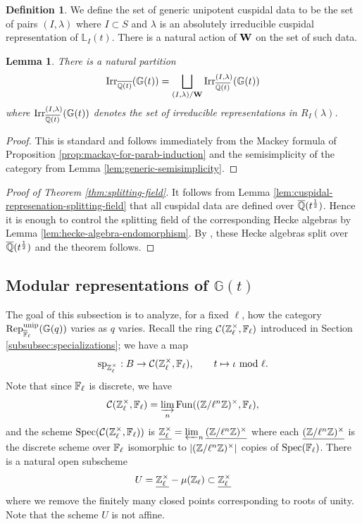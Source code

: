 \documentclass[a4paper, 10pt, oneside, reqno]{amsart}
\theoremstyle{plain}
\newtheorem{lem}[thm]{Lemma}
\theoremstyle{definition}
\newtheorem{defi}[thm]{Definition}
\theoremstyle{remark}
\newcommand{\Gbb}{\mathbb{G}}
\newcommand{\spe}{\mathrm{sp}}
\newcommand{\Lbb}{\mathbb{L}}
\begin{document}
\begin{defi}
We define  the set of generic unipotent cuspidal data to be the set of pairs $(I, \lambda)$ where $I \subset S$ and $\lambda$ is an absolutely irreducible cuspidal representation of $\Lbb_I(t)$. There is a natural action of $\mathbf{W}$ on the set of such data. 
\end{defi}

\begin{lem}
There is a natural partition 
$$\Irr_{\overline{\Q(t)}}(\Gbb(t)) = \bigsqcup_{(I,\lambda)/\Wbf}\Irr_{\overline{\Q(t)}}^{(I,\lambda)}(\Gbb(t))$$
where $\Irr_{\overline{\Q(t)}}^{(I,\lambda)}(\Gbb(t))$ denotes the set of irreducible representations in $R_I(\lambda)$. 
\end{lem}

\begin{proof}
This is standard and follows immediately from the Mackey formula of Proposition \ref{prop:mackay-for-parab-induction} and the semisimplicity of the category from Lemma \ref{lem:generic-semisimplicity}. 
\end{proof}

\begin{proof}[Proof of Theorem \ref{thm:splitting-field}]
It follows from Lemma \ref{lem:cuspidal-represenation-splitting-field} that all cuspidal data are defined over $\overline{\mathbb{Q}}(t^{\frac{1}{2}})$. Hence it is enough to control the splitting field of the corresponding Hecke algebras by Lemma \ref{lem:hecke-algebra-endomorphism}. By \cite[Theorem 8.2, Corollary 8.3]{CurtisRepresentationsHeckeAlgebras}, these Hecke algebras split over $\overline{\mathbb{Q}}(t^{\frac{1}{2}})$ and the theorem follows. 
\end{proof}



\subsection{Modular representations of $\Gbb(t)$}\label{ssec:modular-constancy-of-the-category}

The goal of this subsection is to analyze, for a fixed $\ell$, how the category $\Rep^{\unip}_{\Flb}(\Gbb(q))$ varies as $q$ varies. Recall the ring $\mathcal{C}(\mathbb{Z}_{\ell}^{\times}, \mathbb{F}_{\ell})$ introduced in Section \ref{subsubsec:specializations}; we have a map 
$$\spe_{\Zl^{\times}} : B \to \Ccal(\Zl^{\times}, \Fl), \qquad t \mapsto \iota \  \mathrm{mod} \ \ell.$$
Note that since $\mathbb{F}_{\ell}$ is discrete, we have 
$$\mathcal{C}(\mathbb{Z}_{\ell}^{\times}, \mathbb{F}_{\ell}) = \varinjlim_n \mathrm{Fun}((\mathbb{Z}/\ell^n\mathbb{Z})^{\times}, \mathbb{F}_{\ell}),$$
and the scheme $\mathrm{Spec}(\mathcal{C}(\mathbb{Z}_{\ell}^{\times}, \mathbb{F}_{\ell}))$ is $\underline{\mathbb{Z}_{\ell}^{\times}} = \varprojlim_{n} \underline{(\mathbb{Z}/\ell^{n}\mathbb{Z})^{\times}}$ where each $\underline{(\mathbb{Z}/\ell^{n}\mathbb{Z})^{\times}}$ is the discrete scheme over $\mathbb{F}_{\ell}$ isomorphic to $|(\mathbb{Z}/\ell^{n}\mathbb{Z})^{\times}|$ copies of $\mathrm{Spec}(\mathbb{F}_{\ell})$. There is a natural open subscheme 
$$U = \underline{\mathbb{Z}_{\ell}^{\times}} - \mu(\mathbb{Z}_{\ell}) \subset \underline{\mathbb{Z}_{\ell}^{\times}}$$
where we remove the finitely many closed points corresponding to roots of unity. Note that the scheme $U$ is not affine. 
\end{document}
